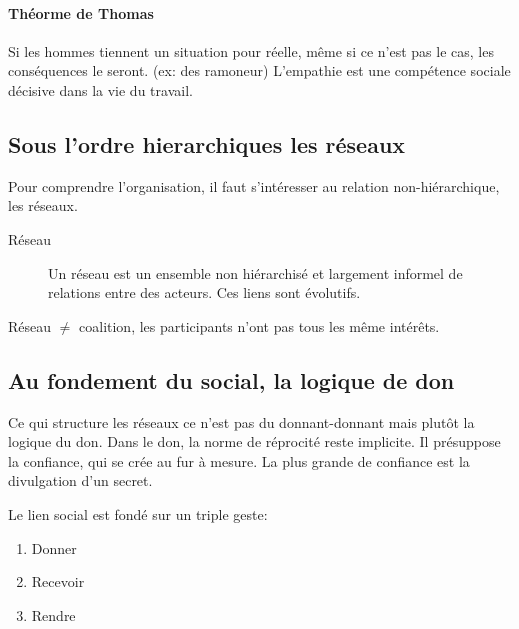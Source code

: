 \documentclass[11pt]{article} %
\begin{document}
\paragraph{Théorme de Thomas} 
Si les hommes tiennent un situation pour réelle, même si ce n'est pas
le cas, les conséquences le seront. (ex: des ramoneur) L'empathie est
une compétence sociale décisive dans la vie du travail.


\subsection{Sous l'ordre hierarchiques les réseaux}
		Pour comprendre l'organisation, il faut s'intéresser au relation non-hiérarchique, les réseaux.
\begin{description}
\item[Réseau] Un réseau est un ensemble non hiérarchisé et largement informel de relations entre des acteurs. Ces liens sont évolutifs.
\end{description}

Réseau $\neq$ coalition, les participants n'ont pas tous les même intérêts.

\subsection{Au fondement du social, la logique de don}
		Ce qui structure les réseaux ce n'est pas du donnant-donnant mais plutôt la logique du don. Dans le don, la norme de réprocité reste implicite. Il présuppose la confiance, qui se crée au fur à mesure. La plus grande de confiance est la divulgation d'un secret.

Le lien social est fondé sur un triple geste:
\begin{enumerate}
\item Donner
\item Recevoir
\item Rendre
\end{enumerate}
\end{document}

